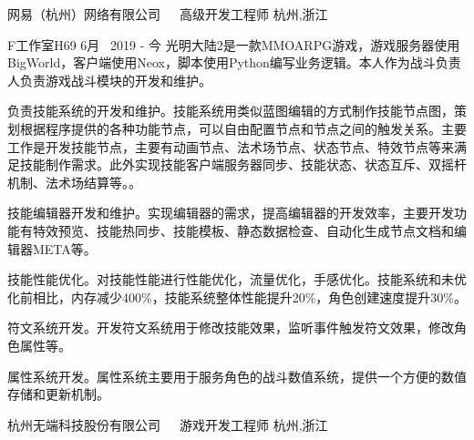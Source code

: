 


\begin{cventries}

\cventrycompany
{网易（杭州）网络有限公司~~~高级开发工程师} %
{杭州,浙江} %

\cventryproject
{F工作室H69} %
{6月~ 2019 - 今} %
{光明大陆2是一款MMOARPG游戏，游戏服务器使用BigWorld，客户端使用Neox，脚本使用Python编写业务逻辑。本人作为战斗负责人负责游戏战斗模块的开发和维护。}
{ %
	\begin{cvitems}
		\item {负责技能系统的开发和维护。技能系统用类似蓝图编辑的方式制作技能节点图，策划根据程序提供的各种功能节点，可以自由配置节点和节点之间的触发关系。主要工作是开发技能节点，主要有动画节点、法术场节点、状态节点、特效节点等来满足技能制作需求。此外实现技能客户端服务器同步、技能状态、状态互斥、双摇杆机制、法术场结算等。}。
		\item{技能编辑器开发和维护。实现编辑器的需求，提高编辑器的开发效率，主要开发功能有特效预览、技能热同步、技能模板、静态数据检查、自动化生成节点文档和编辑器META等。}
		\item{技能性能优化。对技能性能进行性能优化，流量优化，手感优化。技能系统和未优化前相比，内存减少400\%，技能系统整体性能提升20\%，角色创建速度提升30\%。}
		\item{符文系统开发。开发符文系统用于修改技能效果，监听事件触发符文效果，修改角色属性等。}
		\item{属性系统开发。属性系统主要用于服务角色的战斗数值系统，提供一个方便的数值存储和更新机制。}
	\end{cvitems}
}


\cventrycompany
{杭州无端科技股份有限公司~~~游戏开发工程师} %
{杭州,浙江} %


\end{cventries}
